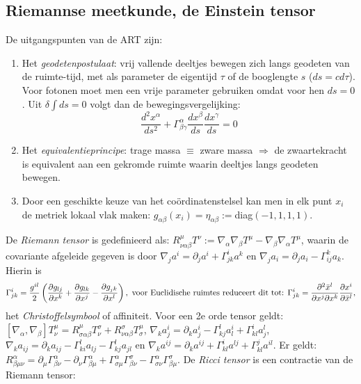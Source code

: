 \subsection{Riemannse meetkunde, de Einstein tensor}
De uitgangspunten van de ART zijn:
\begin{enumerate}
\item Het {\it geodetenpostulaat}: vrij vallende deeltjes bewegen zich langs
      geodeten van de ruimte-tijd, met als parameter de eigentijd $\tau$ of
      de booglengte $s$ ($ds=cd\tau$). Voor fotonen moet men een vrije
      parameter gebruiken omdat voor hen $ds=0$. Uit $\delta\int ds=0$ volgt
      dan de bewegingsvergelijking:
      \[
      \frac{d^2x^\alpha}{ds^2}+\Gamma_{\beta\gamma}^{\alpha}\frac{dx^\beta}{ds}\frac{dx^\gamma}{ds}=0
      \]
\item Het {\it equivalentieprincipe}: trage massa $\equiv$ zware massa
      $\Rightarrow$ de zwaartekracht is equivalent aan een gekromde ruimte
      waarin deeltjes langs geodeten bewegen.
\item Door een geschikte keuze van het co\"ordinatenstelsel kan men in elk
      punt $x_i$ de metriek lokaal vlak maken:
      $g_{\alpha\beta}(x_i)=\eta_{\alpha\beta}:=$diag$(-1,1,1,1)$.
\end{enumerate}
\npar
De {\it Riemann tensor} is gedefinieerd als:
$R^\mu_{\nu\alpha\beta}T^\nu:=\nabla_\alpha\nabla_\beta T^\mu-\nabla_\beta\nabla_\alpha T^\mu$,
waarin de covariante afgeleide gegeven is door
$\nabla_j a^i=\partial_ja^i+\Gamma_{jk}^ia^k$ en
$\nabla_j a_i=\partial_ja_i-\Gamma_{ij}^ka_k$. Hierin is
\[
\Gamma_{jk}^i=\frac{g^{il}}{2}\left(\frac{\partial g_{lj}}{\partial x^k}+
\frac{\partial g_{lk}}{\partial x^j}-\frac{\partial g_{_jk}}{\partial x^l}\right),
\mbox{ voor Euclidische ruimtes reduceert dit tot: }
\Gamma_{jk}^i=\frac{\partial^2\bar{x}^l}{\partial x^j\partial x^k}\frac{\partial x^i}{\partial \bar{x}^l},
\]
het {\it Christoffelsymbool} of affiniteit. Voor een 2e orde tensor geldt:
$[\nabla_\alpha,\nabla_\beta]T_\nu^\mu=R_{\sigma\alpha\beta}^\mu T^\sigma_\nu+R^\sigma_{\nu\alpha\beta}T^\mu_\sigma$,
$\nabla_k a^i_j=\partial_ka^i_j-\Gamma_{kj}^la_l^i+\Gamma_{kl}^ia_j^l$,
$\nabla_k a_{ij}=\partial_ka_{ij}-\Gamma_{ki}^la_{lj}-\Gamma_{kj}^la_{jl}$ en
$\nabla_k a^{ij}=\partial_ka^{ij}+\Gamma_{kl}^ia^{lj}+\Gamma_{kl}^ja^{il}$.
Er geldt: $R_{\beta\mu\nu}^\alpha=\partial_\mu\Gamma_{\beta\nu}^\alpha-\partial_\nu\Gamma_{\beta\mu}^\alpha+
\Gamma_{\sigma\mu}^\alpha\Gamma_{\beta\nu}^\sigma-\Gamma_{\sigma\nu}^\alpha\Gamma_{\beta\mu}^\sigma$.
\npar
De {\it Ricci tensor} is een contractie van de Riemann tensor:
